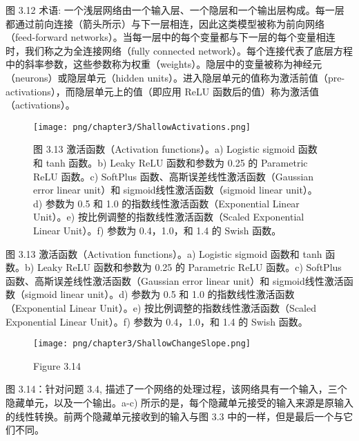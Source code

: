 图 3.12 术语: 一个浅层网络由一个输入层、一个隐层和一个输出层构成。每一层都通过前向连接（箭头所示）与下一层相连，因此这类模型被称为前向网络（feed-forward networks）。当每一层中的每个变量都与下一层的每个变量相连时，我们称之为全连接网络（fully connected network）。每个连接代表了底层方程中的斜率参数，这些参数称为权重（weights）。隐层中的变量被称为神经元（neurons）或隐层单元（hidden units）。进入隐层单元的值称为激活前值（pre-activations），而隐层单元上的值（即应用 ReLU 函数后的值）称为激活值（activations）。


\begin{figure}[h!]
\centering
\texttt{[image: png/chapter3/ShallowActivations.png]}
\caption{图 3.13 激活函数（Activation functions）。a) Logistic sigmoid 函数和 tanh 函数。b) Leaky ReLU 函数和参数为 0.25 的 Parametric ReLU 函数。c) SoftPlus 函数、高斯误差线性激活函数（Gaussian error linear unit）和 sigmoid线性激活函数（sigmoid linear unit）。d) 参数为 0.5 和 1.0 的指数线性激活函数（Exponential Linear Unit）。e) 按比例调整的指数线性激活函数（Scaled Exponential Linear Unit）。f) 参数为 0.4，1.0，和 1.4 的 Swish 函数。}
\end{figure}

图 3.13 激活函数（Activation functions）。a) Logistic sigmoid 函数和 tanh 函数。b) Leaky ReLU 函数和参数为 0.25 的 Parametric ReLU 函数。c) SoftPlus 函数、高斯误差线性激活函数（Gaussian error linear unit）和 sigmoid线性激活函数（sigmoid linear unit）。d) 参数为 0.5 和 1.0 的指数线性激活函数（Exponential Linear Unit）。e) 按比例调整的指数线性激活函数（Scaled Exponential Linear Unit）。f) 参数为 0.4，1.0，和 1.4 的 Swish 函数。


\begin{figure}[h!]
\centering
\texttt{[image: png/chapter3/ShallowChangeSlope.png]}
\caption{Figure 3.14}
\end{figure}

图 3.14：针对问题 3.4, 描述了一个网络的处理过程，该网络具有一个输入，三个隐藏单元，以及一个输出。a-c) 所示的是，每个隐藏单元接受的输入来源是原输入的线性转换。前两个隐藏单元接收到的输入与图 3.3 中的一样，但是最后一个与它们不同。